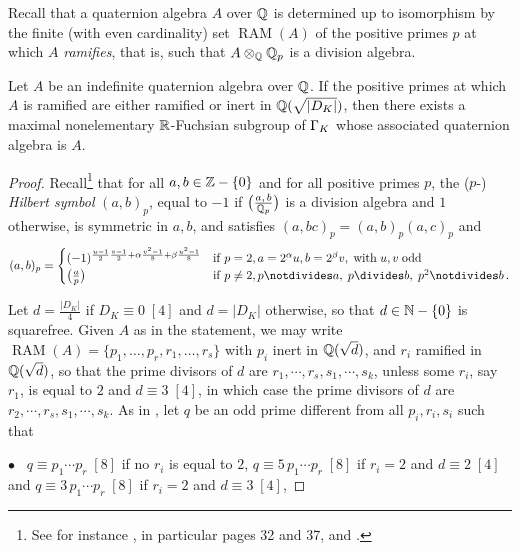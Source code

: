 \documentclass[11pt]{article}
\begin{document}
\noindent 
Recall that a quaternion algebra $A$ over ${\mathbb Q}$ is determined up to
isomorphism by the finite (with even cardinality) set
$\operatorname{RAM}(A)$ of the positive primes $p$ at which $A$ {\it
  ramifies}, that is, such that $A\otimes_{\mathbb Q}{\mathbb Q}_p$ is a division
algebra.

\bprop \label{prop:construcRfuchs} Let $A$ be an indefinite quaternion
algebra over ${\mathbb Q}$. If the positive primes at which $A$ is ramified
are either ramified or inert in ${\mathbb Q}(\sqrt{|D_K|})$, then there exists
a maximal nonelementary ${\mathbb R}$-Fuchsian subgroup of $\Gamma_K$ whose
associated quaternion algebra is $A$.  \eprop

\begin{proof}
Recall\footnote{See for instance \cite{Vigneras80}, in particular
  pages 32 and 37, and \cite[Chap.~III]{Serre70}.} that for all
$a,b\in{\mathbb Z}-\{0\}$ and for all positive primes $p$, the ($p$-){\it
  Hilbert symbol} $(a,b)_p$, equal to $-1$ if $\big(\frac{a,
  \,b}{{\mathbb Q}_p}\big)$ is a division algebra and $1$ otherwise, is
symmetric in $a,b$, and satisfies $(a,bc)_p=(a,b)_p(a,c)_p$ and
\begin{equation}\label{eq:properthilbsymbmodp}
(a,b)_p=
\begin{cases} 
(-1)^{\frac{u-1}{2}\frac{v-1}{2}+\alpha\frac{v^2-1}{8}+\beta\frac{u^2-1}{8}}
& {\rm if}\;p= 2, a=2^\alpha u, b=2^\beta v, \;{\rm with}\; 
u,v \;{\rm odd}\\
\big(\frac{a}{p}\big) & 
{\rm if}\;p\neq 2, p\notdivides a, \;p\divides b, \;p^2\notdivides b\,.
\end{cases}
\end{equation}

Let $d=\frac{|D_K|}{4}$ if $D_K\equiv 0\;[4]$ and $d=|D_K|$ otherwise,
so that $d\in{\mathbb N}-\{0\}$ is squarefree. Given $A$ as in the statement,
we may write $\operatorname{RAM}(A)=\{p_1,\dots,p_r,r_1,\dots,r_s\}$
with $p_i$ inert in ${\mathbb Q}(\sqrt{d})$, and $r_i$ ramified in
${\mathbb Q}(\sqrt{d})$, so that the prime divisors of $d$ are $r_1,\cdots,
r_s, s_1,\cdots, s_k$, unless some $r_i$, say $r_1$, is equal to $2$
and $d\equiv 3\;[4]$, in which case the prime divisors of $d$ are
$r_2,\cdots, r_s,s_1,\cdots, s_k$.  As in \cite[page
  310]{Maclachlan86}, let $q$ be an odd prime different from all
$p_i,r_i,s_i$ such that

$\bullet$~ $q\equiv p_1\cdots p_r\;[8]$ if no $r_i$ is equal to $2$,
$q\equiv 5\,p_1\cdots p_r\;[8]$ if $r_i=2$ and $d\equiv 2\;[4]$ and 
$q\equiv 3\,p_1\cdots p_r\;[8]$ if $r_i=2$ and $d\equiv 3\;[4]$,


\end{proof}
\end{document}
